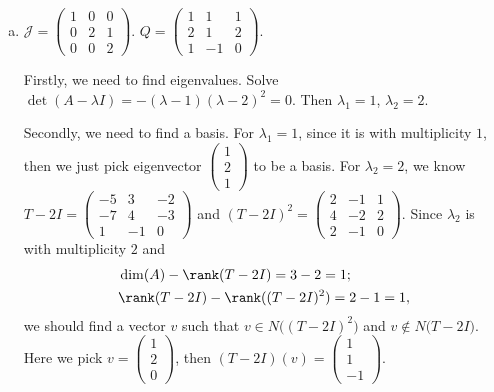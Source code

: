 \begin{Exercise}
	\begin{enumerate}[(a)]
		\item
		\begin{answer}
			$\mathcal{J} = \begin{pmatrix}
			1 & 0 & 0 \\
			0 & 2 & 1 \\
			0 & 0 & 2
			\end{pmatrix}$. $Q = \begin{pmatrix}
			1 & 1 & 1 \\
			2 & 1 & 2 \\
			1 & -1 & 0
			\end{pmatrix}$. 
		\end{answer}
		\begin{solution}
			Firstly, we need to find eigenvalues. Solve $\det(A-\lambda I) = -(\lambda-1)(\lambda-2)^2 = 0$. Then $\lambda_1 = 1$, $\lambda_2 = 2$.
			
			Secondly, we need to find a basis. For $\lambda_1 = 1$, since it is with multiplicity $1$, then we just pick eigenvector $\begin{pmatrix}
			1 \\
			2 \\
			1
			\end{pmatrix}$ to be a basis. For $\lambda_2 = 2$, we know $T-2I = \begin{pmatrix}
			-5 & 3 & -2 \\
			-7 & 4 & -3 \\
			1 & -1 & 0
			\end{pmatrix}$ and $(T-2I)^2 = \begin{pmatrix}
			2 & -1 & 1 \\
			4 & -2 & 2 \\
			2 & -1 & 0
			\end{pmatrix}$. Since $\lambda_2$ is with multiplicity $2$ and
			\begin{align*}
			&\dim(A)-\rank(T-2I) = 3-2=1; \\
			&\rank(T-2I)-\rank((T-2I)^2) = 2-1 = 1,
			\end{align*}
			we should find a vector $v$ such that $v\in N\big((T-2I)^2\big)$ and $v\notin N\big(T-2I\big)$. Here we pick $v = \begin{pmatrix}
			1 \\
			2 \\
			0
			\end{pmatrix}$, then $(T-2I)(v) = \begin{pmatrix}
			1 \\
			1 \\
			-1
			\end{pmatrix}$. 
			

\end{solution}
\end{enumerate}
\end{Exercise}
